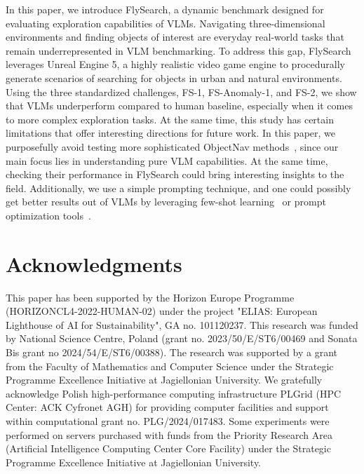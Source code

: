 \documentclass{article}
\theoremstyle{plain}
\theoremstyle{definition}
\theoremstyle{remark}
\newcommand{\ours}{FlySearch}
\newcommand{\challenge}{FS-1}
\newcommand{\anomalychallenge}{FS-Anomaly-1}
\newcommand{\hardchallenge}{FS-2}
\newcommand{\objectnav}{ObjectNav}
\begin{document}
In this paper, we introduce \ours{}, a dynamic benchmark designed for evaluating exploration capabilities of VLMs. Navigating three-dimensional environments and finding objects of interest are everyday real-world tasks that remain underrepresented in VLM benchmarking. To address this gap, \ours{} leverages Unreal Engine 5, a highly realistic video game engine to procedurally generate scenarios of searching for objects in urban and natural environments. Using the three standardized challenges, \challenge{}, \anomalychallenge{}, and \hardchallenge{}, we show that VLMs underperform compared to human baseline, especially when it comes to more complex exploration tasks. 
At the same time, this study has certain limitations that offer interesting directions for future work. 
In this paper, we purposefully avoid testing more sophisticated \objectnav{} methods~\cite{cai2024bridging, kuang2024openfmnav,yu2023l3mvn}, since our main focus lies in understanding pure VLM capabilities. At the same time, checking their performance in \ours{} could bring interesting insights to the field.
Additionally, we use a simple prompting technique, and one could possibly get better results out of VLMs by leveraging few-shot learning~\cite{brown2020language,parnami2022learning} or prompt optimization tools~\cite{pryzant2023automatic,zhoularge}. 




\section*{Acknowledgments}
\label{sec:acknowledgments}
This paper has been supported by the Horizon Europe Programme (HORIZONCL4-2022-HUMAN-02) under the project "ELIAS: European Lighthouse of AI
for Sustainability", GA no. 101120237. This research was funded by National Science Centre, Poland (grant no. 2023/50/E/ST6/00469 and Sonata Bis grant no 2024/54/E/ST6/00388).
The research was supported by a grant from the Faculty of Mathematics and Computer Science under the
Strategic Programme Excellence Initiative at Jagiellonian University. We gratefully acknowledge Polish high-performance computing infrastructure PLGrid (HPC Center: ACK Cyfronet AGH) for providing computer facilities and support within computational grant no. PLG/2024/017483. Some experiments were performed on servers purchased with funds from the Priority Research Area (Artificial Intelligence Computing Center Core Facility) under the Strategic Programme Excellence Initiative at Jagiellonian University.







\newpage



\end{document}
